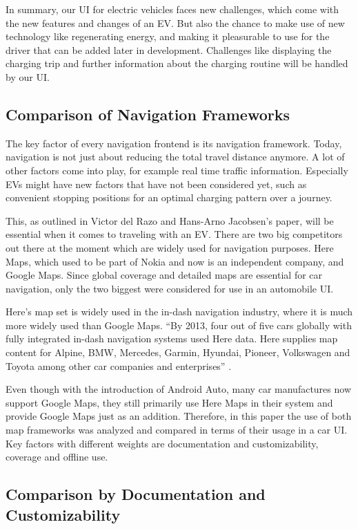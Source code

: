 In summary, our UI for electric vehicles faces new challenges, which come with the new features and changes of an EV. But also the chance to make use of new technology like regenerating energy, and making it pleasurable to use for the driver that can be added later in development. Challenges like displaying the charging trip and further information about the charging routine will be handled by our UI. 

\subsection{Comparison of Navigation Frameworks}

The key factor of every navigation frontend is its navigation framework. Today, navigation is not just about reducing the total travel distance anymore. A lot of other factors come into play, for example real time traffic information. Especially EVs might have new factors that have not been considered yet, such as convenient stopping positions for an optimal charging pattern over a journey.

This, as outlined in Victor del Razo and Hans-Arno Jacobsen's paper, will be essential when it comes to traveling with an EV. There are two big competitors out there at the moment which are widely used for navigation purposes. Here Maps, which used to be part of Nokia and now is an independent company, and Google Maps. Since global coverage and detailed maps are essential for car navigation, only the two biggest were considered for use in an automobile UI.

Here's map set is widely used in the in-dash navigation industry, where it is much more widely used than Google Maps. ``By 2013, four out of five cars globally with fully integrated in-dash navigation systems used Here data. Here supplies map content for Alpine, BMW, Mercedes, Garmin, Hyundai, Pioneer, Volkswagen and Toyota among other car companies and enterprises'' \cite{driver-12}.

Even though with the introduction of Android Auto, many car manufactures now support Google Maps, they still primarily use Here Maps in their system and provide Google Maps just as an addition. Therefore, in this paper the use of both map frameworks was analyzed and compared in terms of their usage in a car UI. Key factors with different weights are documentation and customizability, coverage and offline use.

\subsection{Comparison by Documentation and Customizability}

